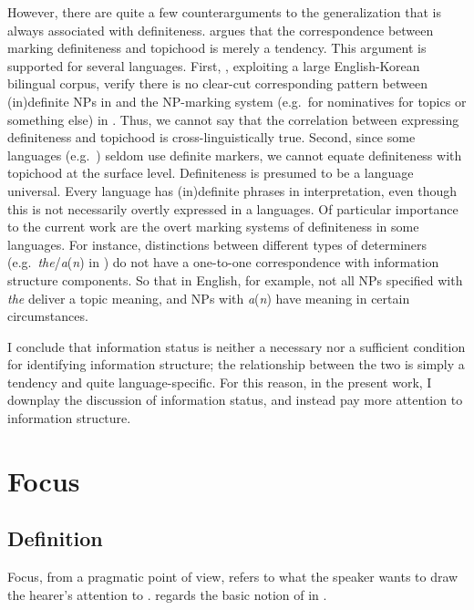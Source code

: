 \noindent However, there are quite a few counterarguments to the
generalization that  is always associated with definiteness.
\citet{erteschik:07} argues that the correspondence between marking
definiteness and topichood is merely a tendency. This argument is
supported for several languages. First, \citet{yoo:etal:07},
exploiting a large English-Korean bilingual corpus, verify there is no
clear-cut corresponding pattern between (in)definite NPs in 
and the NP-marking system (e.g.\ \ika for nominatives \vs \nun for
topics or something else) in . Thus, we cannot say that
the correlation between expressing definiteness and topichood is
cross-linguistically true. Second, since some languages
(e.g.\ ) seldom use definite markers, we cannot equate
definiteness with topichood at the surface level.  Definiteness is
presumed to be a language universal. Every language has (in)definite
phrases in interpretation, even though this is not necessarily overtly
expressed in a languages.  Of particular importance to the current
work are the overt marking systems of definiteness in some
languages. For instance, distinctions between different types of
determiners (e.g.\ \textit{the}/\textit{a}(\textit{n}) in ) do
not have a one-to-one correspondence with information structure
components.  So that in English, for example, not all NPs specified
with \textit{the} deliver a topic meaning, and NPs with
\textit{a}(\textit{n}) have  meaning in certain circumstances.

I conclude that information status is neither a necessary nor a
sufficient condition for identifying information structure; the
relationship between the two is simply a tendency and quite
language-specific. For this reason, in the present work, I downplay
the discussion of information status, and instead pay more attention
to information structure.



\section{Focus}
\label{3:sec:focus}


\subsection{Definition}
\label{3:ssec:definition-focus}

Focus, from a pragmatic point of view, refers to what the speaker
wants to draw the hearer's attention to
\citep{erteschik:07,fery:krifka:08}.  \citet{lambrecht:96} regards the
basic notion of  in .

